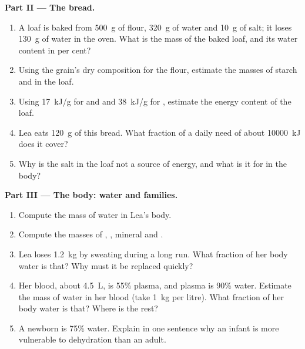 \begin{problem}
\medskip
\noindent\textbf{Part II --- The bread.}
\begin{enumerate}[resume]
  \item A loaf is baked from \qty{500}{g} of flour, \qty{320}{g} of
        water and \qty{10}{g} of salt; it loses \qty{130}{g} of water
        in the oven. What is the mass of the baked loaf, and its water
        content in per cent?
  \item Using the grain's dry composition for the flour, estimate the
        masses of starch and  in the loaf.
  \item Using \qty{17}{kJ/g} for  and  and
        \qty{38}{kJ/g} for , estimate the energy content of the
        loaf.
  \item Lea eats \qty{120}{g} of this bread. What fraction of a daily
        need of about \qty{10000}{kJ} does it cover?
  \item Why is the salt in the loaf not a source of energy, and what is
        it for in the body?
\end{enumerate}

\medskip
\noindent\textbf{Part III --- The body: water and families.}
\begin{enumerate}[resume]
  \item Compute the mass of water in Lea's body.
  \item Compute the masses of , , mineral and .
  \item Lea loses \qty{1.2}{kg} by sweating during a long run. What
        fraction of her body water is that? Why must it be replaced
        quickly?
  \item Her blood, about \qty{4.5}{L}, is 55\% plasma, and plasma is
        90\% water. Estimate the mass of water in her blood (take
        \qty{1}{kg} per litre). What fraction of her body water is
        that? Where is the rest?
  \item A newborn is 75\% water. Explain in one sentence why an infant
        is more vulnerable to dehydration than an adult.
\end{enumerate}


\end{problem}
